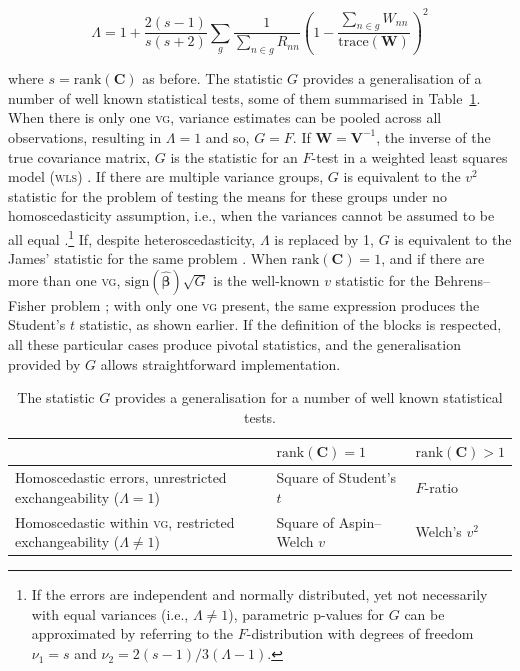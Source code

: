 \begin{equation}
\Lambda = 1+\frac{2(s-1)}{s(s+2)}\sum_{g} \frac{1}{\sum_{n \in g}R_{nn}} \left(1-\frac{\sum_{n \in g}W_{nn}}{\mathrm{trace}\left(\mathbf{W}\right)}\right)^2
\end{equation}

\noindent
where $s=\mathrm{rank}\left(\mathbf{C}\right)$ as before. The statistic $G$ provides a generalisation of a number of well known statistical tests, some of them summarised in Table~\ref{tab:G}. When there is only one \textsc{vg}, variance estimates can be pooled across all observations, resulting in $\Lambda=1$ and so, $G=F$. If $\mathbf{W}=\mathbf{V}^{-1}$, the inverse of the true covariance matrix, $G$ is the statistic for an $F$-test in a weighted least squares model (\textsc{wls}) \citep{Christensen2002}. If there are multiple variance groups, $G$ is equivalent to the $v^2$ statistic for the problem of testing the means for these groups under no homoscedasticity assumption, i.e., when the variances cannot be assumed to be all equal \citep{Welch1951}.\footnote{If the errors are independent and normally distributed, yet not necessarily with equal variances (i.e., $\Lambda \neq 1$), parametric p-values for $G$ can be approximated by referring to the $F$-distribution with degrees of freedom $\nu_1=s$ and $\nu_2=2(s-1)/3(\Lambda-1)$.} If, despite heteroscedasticity, $\Lambda$ is replaced by 1, $G$ is equivalent to the James' statistic for the same problem \citep{James1951}. When $\mathrm{rank}\left(\mathbf{C}\right) = 1$, and if there are more than one \textsc{vg}, $\mathrm{sign}(\boldsymbol{\hat{\beta}})\sqrt{G}$ is the well-known $v$ statistic for the Behrens--Fisher problem \citep{Fisher1935_fid, Aspin1949}; with only one \textsc{vg} present, the same expression produces the Student's $t$ statistic, as shown earlier. If the definition of the blocks is respected, all these particular cases produce pivotal statistics, and the generalisation provided by $G$ allows straightforward implementation.

\begin{table}[!t]
\caption[Some tests of which the statistic $G$ is a generalisation.]{The statistic $G$ provides a generalisation for a number of well known statistical tests.}
\begin{center}
{\small
\begin{tabular}{@{}m{70mm}<{\raggedright}@{}m{25mm}<{\centering}m{25mm}<{\centering}@{}}
\toprule
{} & $\mathrm{rank}\left(\mathbf{C}\right) = 1$ & $\mathrm{rank}\left(\mathbf{C}\right) > 1$ \\
\midrule
Homoscedastic errors, unrestricted exchangeability ($\Lambda = 1$) & Square of Student's $t$ & $F$-ratio \\
\midrule
Homoscedastic within \textsc{vg}, restricted exchangeability ($\Lambda \neq 1$) & Square of Aspin--Welch $v$ & Welch's $v^2$\\
\bottomrule
\end{tabular}}
\end{center}
\label{tab:G}
\end{table}

